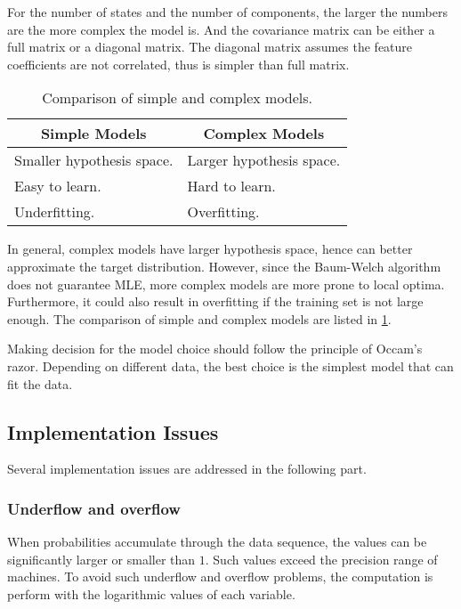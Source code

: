 \documentclass[12pt,final,twoside]{report}
\begin{document}
For the number of states and the number of components, the larger the numbers are the more complex the model is. And the covariance matrix can be either a full matrix or a diagonal matrix. The diagonal matrix assumes the feature coefficients are not correlated, thus is simpler than full matrix.

\begin{table}[t]
  \caption{Comparison of simple and complex models.}
  \label{tab:model}
  \centering
  \begin{tabular}{p{}p{}}
    \toprule
    \multicolumn{1}{c}{\bfseries Simple Models} & \multicolumn{1}{c}{\bfseries Complex Models} \\ \midrule
    Smaller hypothesis space. & Larger hypothesis space. \\
    Easy to learn. & Hard to learn. \\
    Underfitting. & Overfitting. \\
    \bottomrule
  \end{tabular}
\end{table}

In general, complex models have larger hypothesis space, hence can better approximate the target distribution. However, since the Baum-Welch algorithm does not guarantee MLE, more complex models are more prone to local optima. Furthermore, it could also result in overfitting if the training set is not large enough. The comparison of simple and complex models are listed in \cref{tab:model}.

Making decision for the model choice should follow the principle of Occam's razor. Depending on different data, the best choice is the simplest model that can fit the data.

\subsection{Implementation Issues}
Several implementation issues are addressed in the following part.

\subsubsection{Underflow and overflow}

When probabilities accumulate through the data sequence, the values can be significantly larger or smaller than $1$. Such values exceed the precision range of machines. To avoid such underflow and overflow problems, the computation is perform with the logarithmic values of each variable. 
\end{document}
